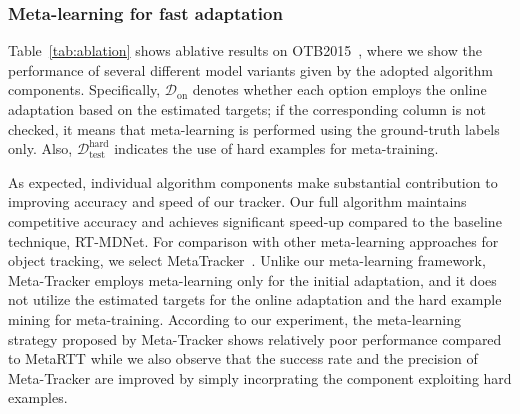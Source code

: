 \documentclass[letterpaper]{article} %
\def \dataonline{\mathcal{D}_\text{on}}
\def \dataval{\mathcal{D}_\text{test}}
\begin{document}
\subsubsection{Meta-learning for fast adaptation}
Table~\ref{tab:ablation} shows ablative results on OTB2015~\cite{wu2013online}, where we show the performance of several different model variants given by the adopted algorithm components.
Specifically, $\dataonline$ denotes whether each option employs the online adaptation based on the estimated targets; if the corresponding column is not checked, it means that meta-learning is performed using the ground-truth labels only.
Also, $\dataval^\text{hard}$ indicates the use of hard examples for meta-training.

As expected, individual algorithm components make substantial contribution to improving accuracy and speed of our tracker.
Our full algorithm maintains competitive accuracy and achieves significant speed-up compared to the baseline technique, RT-MDNet.
For comparison with other meta-learning approaches for object tracking, we select MetaTracker~\cite{park2018metatracker}. 
Unlike our meta-learning framework, Meta-Tracker employs meta-learning only for the initial adaptation, and it does not utilize the estimated targets for the online adaptation and the hard example mining for meta-training. 
According to our experiment, the meta-learning strategy proposed by Meta-Tracker shows relatively poor performance compared to MetaRTT while we also observe that the success rate and the precision of Meta-Tracker are improved by simply incorprating the component exploiting hard examples.

\end{document}
